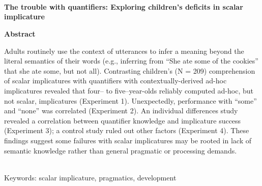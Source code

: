\documentclass[man]{apa2}
\begin{document}
~\\
~\\
~\\
\begin{center}
\textbf{The trouble with quantifiers: Exploring children's deficits in scalar implicature}
\end{center}
\newpage
\begin{center}
\textbf{Abstract}
\vspace{5 mm}
\end{center}
\noindent
Adults routinely use the context of utterances to infer a meaning beyond the literal semantics of their words (e.g., inferring from ``She ate some of the cookies'' that she ate some, but not all). Contrasting children's (N = 209) comprehension of scalar implicatures with quantifiers with contextually-derived ad-hoc implicatures revealed that four-- to five--year-olds reliably computed ad-hoc, but not scalar, implicatures (Experiment 1). Unexpectedly, performance with ``some'' and ``none'' was correlated (Experiment 2). An individual differences study revealed a correlation between quantifier knowledge and implicature success (Experiment 3); a control study ruled out other factors (Experiment 4). These findings suggest some failures with scalar implicatures may be rooted in lack of semantic knowledge rather than general pragmatic or processing demands.


~\\

\noindent
Keywords: scalar implicature, pragmatics, development

%
%
\end{document}
